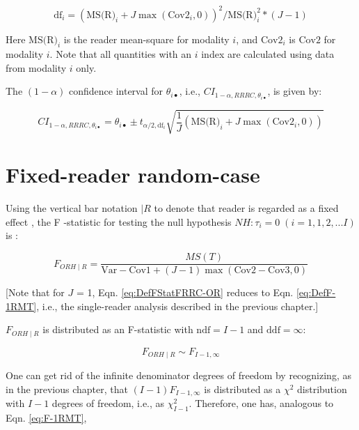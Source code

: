 \documentclass[
]{book}
\begin{document}
\begin{equation}
\text{df}_i = (\text{MS(R)}_i + J\max(\text{Cov2}_{i}, 0))^2/\text{MS(R)}_i^2 * (J - 1)
\label{eq:CI-RRRC-df-IndvlTrt}
\end{equation}

Here \(\text{MS(R)}_i\) is the reader mean-square for modality \(i\), and \(\text{Cov2}_i\) is \(\text{Cov2}\) for modality \(i\). Note that all quantities with an \(i\) index are calculated using data from modality \(i\) only.

The \((1-\alpha)\) confidence interval for \(\theta_{i \bullet}\), i.e., \(CI_{1-\alpha,RRRC,\theta_{i \bullet}}\), is given by:

\begin{equation}
CI_{1-\alpha,RRRC,\theta_{i \bullet}} = \theta_{i \bullet} \pm t_{\alpha/2, \text{df}_i}\sqrt{\textstyle\frac{1}{J}(\text{MS(R)}_i + J\max(\text{Cov2}_{i}, 0))}
\label{eq:CI-RRRC-IndvlTrt}
\end{equation}

\hypertarget{OR-FRRC}{%
\section{Fixed-reader random-case}\label{OR-FRRC}}

Using the vertical bar notation \(\mid R\) to denote that reader is regarded as a fixed effect \citep{RN1124}, the F -statistic for testing the null hypothesis \(NH: \tau_i = 0 \; (i=1,1,2,...I)\) is \citep{RN1865}:

\begin{equation}
F_{ORH \mid R}=\frac{MS(T)}{\text{Var}-\text{Cov1}+(J-1)\max(\text{Cov2}-\text{Cov3},0)}
\label{eq:DefFStatFRRC-OR}
\end{equation}

{[}Note that for \(J\) = 1, Eqn. \eqref{eq:DefFStatFRRC-OR} reduces to Eqn. \eqref{eq:DefF-1RMT}, i.e., the single-reader analysis described in the previous chapter.{]}

\(F_{ORH \mid R}\) is distributed as an F-statistic with \(\text{ndf} = I-1\) and \(\text{ddf} = \infty\):

\begin{equation}
F_{ORH \mid R} \sim F_{I-1,\infty}
\label{eq:FStatDistrFRRC-OR}
\end{equation}

One can get rid of the infinite denominator degrees of freedom by recognizing, as in the previous chapter, that \((I-1) F_{I-1,\infty}\) is distributed as a \(\chi^2\) distribution with \(I-1\) degrees of freedom, i.e., as \(\chi^2_{I-1}\). Therefore, one has, analogous to Eqn. \eqref{eq:F-1RMT},
\end{document}
